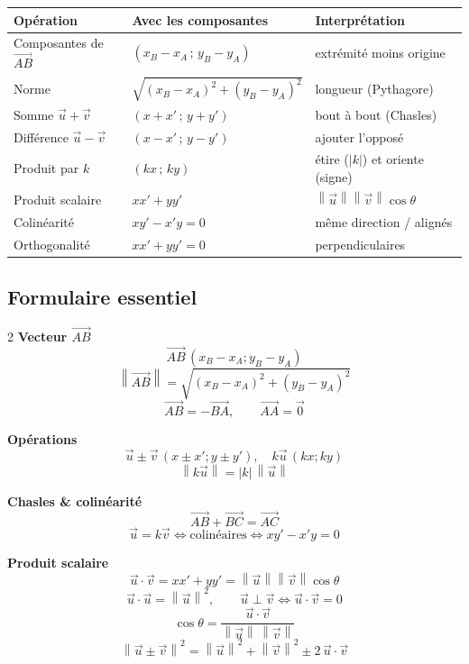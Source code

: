\documentclass[11pt,a4paper]{article}
\newcommand{\vc}[1]{\overrightarrow{#1}}        %
\providecommand{\norm}[1]{\left\lVert #1\right\rVert}
\begin{document}
\begin{center}
\renewcommand{\arraystretch}{1.45}
\begin{tabular}{>{\raggedright\arraybackslash}m{4.1cm} >{\centering\arraybackslash}m{5.0cm} >{\raggedright\arraybackslash}m{5.2cm}}
\toprule
\rowcolor{primary!15}\textbf{Opération} & \textbf{Avec les composantes} & \textbf{Interprétation} \\
\midrule
Composantes de $\vc{AB}$ & $(x_B-x_A\,;\,y_B-y_A)$ & extrémité moins origine \\
Norme & $\sqrt{(x_B-x_A)^2+(y_B-y_A)^2}$ & longueur (Pythagore) \\
Somme $\vec u+\vec v$ & $(x+x'\,;\,y+y')$ & bout à bout (Chasles) \\
Différence $\vec u-\vec v$ & $(x-x'\,;\,y-y')$ & ajouter l'opposé \\
Produit par $k$ & $(kx\,;\,ky)$ & étire ($|k|$) et oriente (signe) \\
Produit scalaire & $x x'+y y'$ & $\norm{\vec u}\norm{\vec v}\cos\theta$ \\
Colinéarité & $xy'-x'y=0$ & même direction / alignés \\
Orthogonalité & $x x'+y y'=0$ & perpendiculaires \\
\bottomrule
\end{tabular}
\end{center}

\subsection{Formulaire essentiel}

\begin{tcolorbox}[boxbase,colback=primary!4,colframe=primary,title={\textsc{À retenir absolument}}]
\begin{multicols}{2}
\footnotesize
\textbf{Vecteur $\vc{AB}$}
\[ \vc{AB}\,(x_B-x_A;y_B-y_A) \]
\[ \norm{\vc{AB}}=\sqrt{(x_B-x_A)^2+(y_B-y_A)^2} \]
\[ \vc{AB}=-\vc{BA},\qquad \vc{AA}=\vec0 \]

\textbf{Opérations}
\[ \vec u\pm\vec v\,(x\pm x';y\pm y'),\quad k\vec u\,(kx;ky) \]
\[ \norm{k\vec u}=|k|\,\norm{\vec u} \]

\columnbreak

\textbf{Chasles \& colinéarité}
\[ \vc{AB}+\vc{BC}=\vc{AC} \]
\[ \vec u=k\vec v \iff \text{colinéaires} \iff xy'-x'y=0 \]

\textbf{Produit scalaire}
\[ \vec u\cdot\vec v=x x'+y y'=\norm{\vec u}\norm{\vec v}\cos\theta \]
\[ \vec u\cdot\vec u=\norm{\vec u}^2,\qquad \vec u\perp\vec v\iff\vec u\cdot\vec v=0 \]
\[ \cos\theta=\frac{\vec u\cdot\vec v}{\norm{\vec u}\,\norm{\vec v}} \]
\[ \norm{\vec u\pm\vec v}^2=\norm{\vec u}^2+\norm{\vec v}^2\pm2\,\vec u\cdot\vec v \]
\end{multicols}
\end{tcolorbox}
\end{document}
